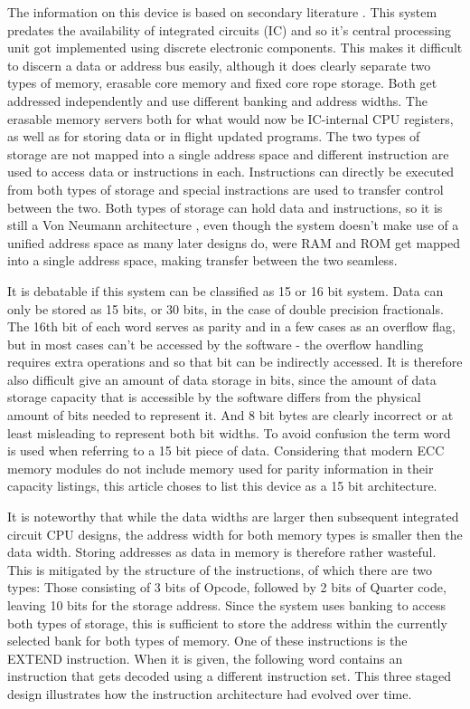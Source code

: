 \documentclass[twoside,twocolumn]{article}
\begin{document}
The information on this device is based on secondary literature \cite{agc}. This system
predates the availability of integrated circuits (IC) and so it's central processing unit
got implemented using discrete electronic components. This makes it difficult to discern
a data or address bus easily, although it does clearly separate two types of memory,
erasable core memory and fixed core rope storage. Both get addressed independently and
use different banking and address widths. The erasable memory servers both for what would
now be IC-internal CPU registers, as well as for storing data or in flight updated
programs. The two types of storage are not mapped into a single address space and
different instruction are used to access data or instructions in each. Instructions can
directly be executed from both types of storage and special instractions are used to
transfer control between the two. Both types of storage can hold data and instructions,
so it is still a Von Neumann architecture \cite{edvac}, even though the system doesn't
make use of a unified address space as many later designs do, were RAM and ROM get mapped
into a single address space, making transfer between the two seamless.

It is debatable if this system can be classified as 15 or 16 bit system. Data can only be
stored as 15 bits, or 30 bits, in the case of double precision fractionals. The 16th bit
of each word serves as parity and in a few cases as an overflow flag, but in most cases
can't be accessed by the software - the overflow handling requires extra operations and
so that bit can be indirectly accessed. It is therefore also difficult give an amount of
data storage in bits, since the amount of data storage capacity that is accessible by the
software differs from the physical amount of bits needed to represent it. And 8 bit bytes
are clearly incorrect or at least misleading to represent both bit widths. To avoid
confusion the term word is used when referring to a 15 bit piece of data. Considering
that modern ECC memory modules do not include memory used for parity information in their
capacity listings, this article choses to list this device as a 15 bit architecture.

It is noteworthy that while the data widths are larger then subsequent integrated circuit
CPU designs, the address width for both memory types is smaller then the data width.
Storing addresses as data in memory is therefore rather wasteful. This is mitigated by
the structure of the instructions, of which there are two types: Those consisting of 3
bits of Opcode, followed by 2 bits of Quarter code, leaving 10 bits for the storage
address. Since the system uses banking to access both types of storage, this is
sufficient to store the address within the currently selected bank for both types of
memory. One of these instructions is the EXTEND instruction. When it is given, the
following word contains an instruction that gets decoded using a different instruction
set. This three staged design illustrates how the instruction architecture had evolved
over time.
\end{document}
